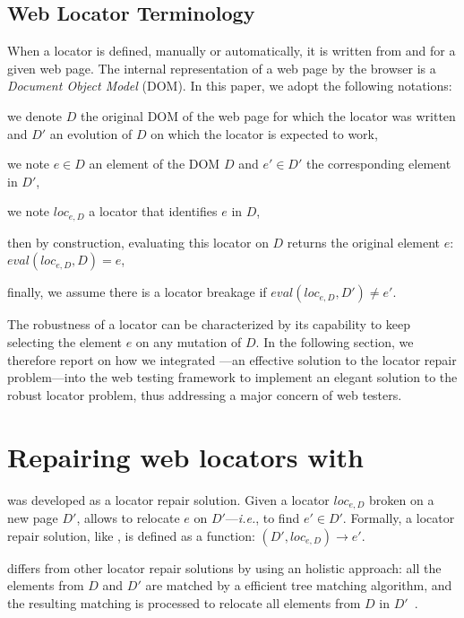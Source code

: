 \documentclass[10pt,conference]{IEEEtran}
\begin{document}
\subsection{Web Locator Terminology}
When a locator is defined, manually or automatically, it is written from and for a given web page.
The internal representation of a web page by the browser is a \emph{Document Object Model} (DOM).
In this paper, we adopt the following notations:
\begin{compactitem}
    \item we denote $D$ the original DOM of the web page for which the locator was written and $D'$ an evolution of $D$ on which the locator is expected to work,
    \item we note $e \in D$ an element of the DOM $D$ and $e'\in D'$ the corresponding element in $D'$,
    \item we note $loc_{e, D}$ a locator that identifies $e$ in $D$,
    \item then by construction, evaluating this locator on $D$ returns the original element $e$: $eval(loc_{e, D}, D) = e$,
    \item finally, we assume there is a locator breakage if $eval(loc_{e, D}, D') \neq e'$.
\end{compactitem}

The robustness of a locator can be characterized by its capability to keep selecting the element $e$ on any mutation of $D$.
In the following section, we therefore report on how we integrated \erratum---an effective solution to the locator repair problem---into the \cerberus web testing framework to implement an elegant solution to the robust locator problem, thus addressing a major concern of web testers.

\section{Repairing web locators with \erratum}\label{sec:erratum}
\erratum was developed as a locator repair solution. 
Given a locator $loc_{e, D}$ broken on a new page $D'$, \erratum allows to relocate $e$ on $D'$---\emph{i.e.}, to find $e' \in D'$.
Formally, a locator repair solution, like \erratum, is defined as a function: $(D', loc_{e, D}) \to e'$.

\erratum differs from other locator repair solutions by using an holistic approach: all the elements from $D$ and $D'$ are matched by a efficient tree matching algorithm, and the resulting matching is processed to relocate all elements from $D$ in $D'$~\cite{brisset2021erratum}.
\end{document}
